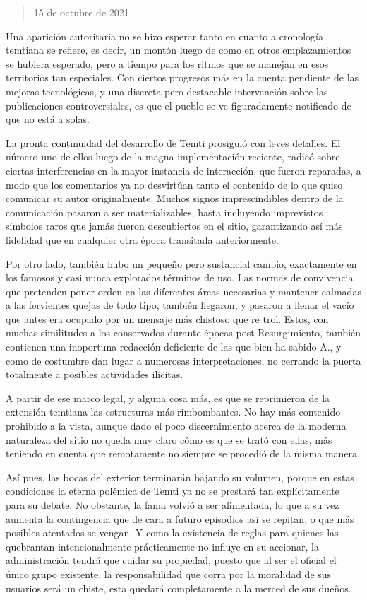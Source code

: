 \documentclass[
]{book}
\begin{document}
\begin{quote}
15 de octubre de 2021
\end{quote}

Una aparición autoritaria no se hizo esperar tanto en cuanto a cronología temtiana se refiere, es decir, un montón luego de como en otros emplazamientos se hubiera esperado, pero a tiempo para los ritmos que se manejan en esos territorios tan especiales. Con ciertos progresos más en la cuenta pendiente de las mejoras tecnológicas, y una discreta pero destacable intervención sobre las publicaciones controversiales, es que el pueblo se ve figuradamente notificado de que no está a solas.

La pronta continuidad del desarrollo de Temti prosiguió con leves detalles. El número uno de ellos luego de la magna implementación reciente, radicó sobre ciertas interferencias en la mayor instancia de interacción, que fueron reparadas, a modo que los comentarios ya no desvirtúan tanto el contenido de lo que quiso comunicar su autor originalmente. Muchos signos imprescindibles dentro de la comunicación pasaron a ser materializables, hasta incluyendo imprevistos símbolos raros que jamás fueron descubiertos en el sitio, garantizando así más fidelidad que en cualquier otra época transitada anteriormente.

Por otro lado, también hubo un pequeño pero sustancial cambio, exactamente en los famosos y casi nunca explorados términos de uso. Las normas de convivencia que pretenden poner orden en las diferentes áreas necesarias y mantener calmadas a las fervientes quejas de todo tipo, también llegaron, y pasaron a llenar el vacío que antes era ocupado por un mensaje más chistoso que re trol. Estos, con muchas similitudes a los conservados durante épocas post-Resurgimiento, también contienen una inoportuna redacción deficiente de las que bien ha sabido A., y como de costumbre dan lugar a numerosas interpretaciones, no cerrando la puerta totalmente a posibles actividades ilícitas.

A partir de ese marco legal, y alguna cosa más, es que se reprimieron de la extensión temtiana las estructuras más rimbombantes. No hay más contenido prohibido a la vista, aunque dado el poco discernimiento acerca de la moderna naturaleza del sitio no queda muy claro cómo es que se trató con ellas, más teniendo en cuenta que remotamente no siempre se procedió de la misma manera.

Así pues, las bocas del exterior terminarán bajando su volumen, porque en estas condiciones la eterna polémica de Temti ya no se prestará tan explícitamente para su debate. No obstante, la fama volvió a ser alimentada, lo que a su vez aumenta la contingencia que de cara a futuro episodios así se repitan, o que más posibles atentados se vengan. Y como la existencia de reglas para quienes las quebrantan intencionalmente prácticamente no influye en su accionar, la administración tendrá que cuidar su propiedad, puesto que al ser el oficial el único grupo existente, la responsabilidad que corra por la moralidad de sus usuarios será un chiste, esta quedará completamente a la merced de sus dueños.
\end{document}
